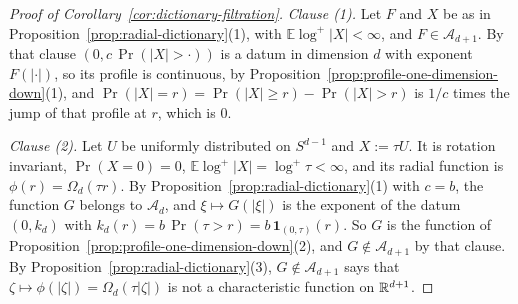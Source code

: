 \begin{proof}[Proof of Corollary~\ref{cor:dictionary-filtration}]
\emph{Clause (1).} Let $F$ and $X$ be as in
Proposition~\ref{prop:radial-dictionary}(1), with $\mathbb{E}\log^+|X| < \infty$, and
$F \in \mathcal{A}_{d+1}$. By that clause
$(0, c\,\Pr(|X| > \cdot))$ is a datum in dimension $d$ with exponent $F(|\cdot|)$, so its profile
is continuous, by Proposition~\ref{prop:profile-one-dimension-down}(1), and
$\Pr(|X| = r) = \Pr(|X| \ge r) - \Pr(|X| > r)$ is $1/c$ times the jump of
that profile at $r$, which is $0$.

\emph{Clause (2).} Let $U$ be uniformly distributed on $S^{d-1}$ and $X := \tau U$. It is
rotation invariant, $\Pr(X = 0) = 0$, $\mathbb{E}\log^+|X| = \log^+\tau < \infty$, and its radial
function is $\phi(r) = \Omega_d(\tau r)$. By Proposition~\ref{prop:radial-dictionary}(1) with $c = b$, the
function $G$ belongs to $\mathcal{A}_d$, and $\xi \mapsto G(|\xi|)$ is the exponent of the datum
$(0,k_d)$ with $k_d(r) = b\,\Pr(\tau > r) = b\,\mathbf 1_{(0,\tau)}(r)$. So $G$ is the function
of Proposition~\ref{prop:profile-one-dimension-down}(2), and $G \notin \mathcal{A}_{d+1}$ by that clause. By
Proposition~\ref{prop:radial-dictionary}(3), $G \notin \mathcal{A}_{d+1}$ says that
$\zeta \mapsto \phi(|\zeta|) = \Omega_d(\tau|\zeta|)$ is not a characteristic function on
$\mathbb{R}^{d+1}$.
\end{proof}

